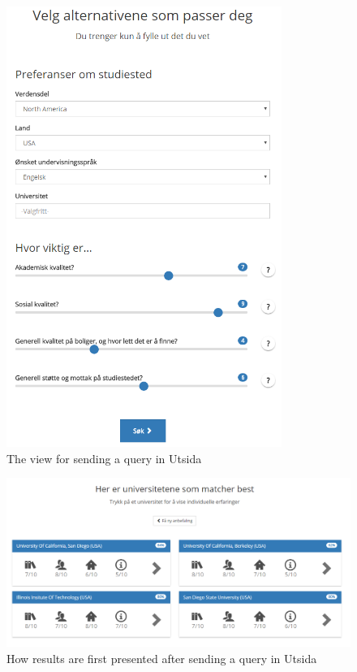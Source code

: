 \begin{figure}
    \centering
    \includegraphics[width=0.8\textwidth]{fig/utsida_screenshots/query.PNG}
    \caption{The view for sending a query in Utsida}
    \label{fig:my_label}
\end{figure}
\begin{figure}
    \centering
    \includegraphics[width=1\textwidth]{fig/utsida_screenshots/results_1.PNG}
    \caption{How results are first presented after sending a query in Utsida}
    \label{fig:my_label}
\end{figure}

